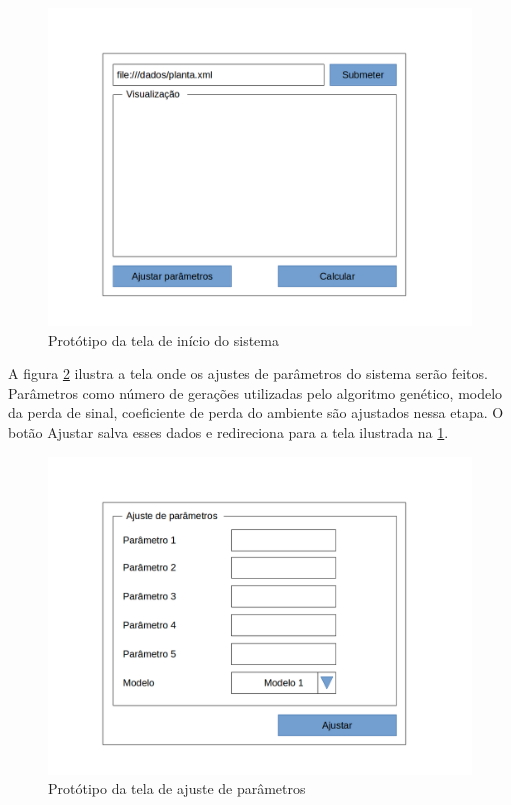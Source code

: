\documentclass[tc,twoside]{iiufrgs}
\begin{document}
\begin{figure}[!h]
	\centering
	\includegraphics[scale=0.4]{img/prototipo1.png}
	\caption{Protótipo da tela de início do sistema}
	\label{fig:prototipoUm}
\end{figure}

A figura \ref{fig:prototipoDois} ilustra a tela onde os ajustes de parâmetros do sistema serão feitos. Parâmetros como número de gerações utilizadas pelo algoritmo genético, modelo da perda de sinal, coeficiente de perda do ambiente são ajustados nessa etapa. O botão Ajustar salva esses dados e redireciona para a tela ilustrada na \ref{fig:prototipoUm}.

\begin{figure}[!h]
	\centering
	\includegraphics[scale=0.4]{img/prototipo2.png}
	\caption{Protótipo da tela de ajuste de parâmetros}
	\label{fig:prototipoDois}
\end{figure}
\end{document}
